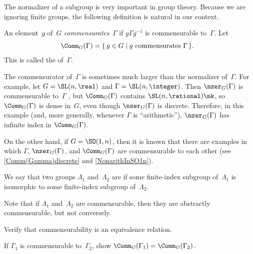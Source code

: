 The normalizer of a subgroup is very important in group
theory. Because we are ignoring finite groups, the
following definition is natural in our context.

\begin{defn}
 An element~$g$ of~$G$ \emph{commensurates}~$\Gamma$ if
$g \Gamma g^{-1}$ is commensurable to~$\Gamma$. Let
 $$\Comm_G(\Gamma) = \{\, g \in G \mid \text{$g$
commensurates~$\Gamma$} \,\} .$$
 This is called the  of~$\Gamma$.
 \end{defn}

\begin{rem}
 The commensurator of~$\Gamma$ is sometimes much larger than the
normalizer of~$\Gamma$. For example, let $G =
\SL(n,\real)$ and $\Gamma = \SL(n,\integer)$. Then
$\nzer_G(\Gamma)$ is commensurable to~$\Gamma$
, but $\Comm_G(\Gamma)$ contains $\SL(n,\rational)\mk$, so $\Comm_G(\Gamma)$
is dense in~$G$, even though $\nzer_G(\Gamma)$ is discrete.
Therefore, in this example (and, more generally, whenever
$\Gamma$ is ``arithmetic''), $\nzer_G(\Gamma)$ has infinite
index in $\Comm_G(\Gamma)$.

On the other hand, if $G = \SO(1,n)$, then it is known
that there are examples in which $\Gamma$, $\nzer_G(\Gamma)$,
and $\Comm_G(\Gamma)$ are commensurable to each other
(see \cref{Comm(Gamma)discrete}
and \cref{NonarithInSO1n}).
 \end{rem}

\begin{defn}
 We say that two groups $\Lambda_1$ and~$\Lambda_2$ are
 if some finite-index subgroup of~$\Lambda_1$ is isomorphic to some finite-index subgroup
of~$\Lambda_2$.
 \end{defn}

Note that if $\Lambda_1$ and~$\Lambda_2$ are
commensurable, then they are abstractly commensurable, but not
conversely.

\begin{exercises}

\item \label{CommEquiv}
 Verify that commensurability is an equivalence relation.

\item If $\Gamma_1$ is commensurable
to~$\Gamma_2$, show $\Comm_G(\Gamma_1) =
\Comm_G(\Gamma_2)$.

\end{exercises}





